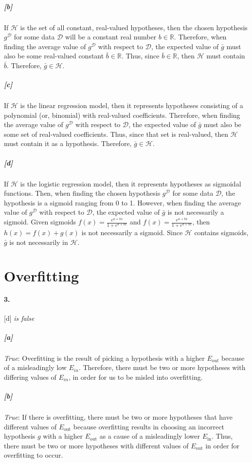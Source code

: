 \documentclass[titlepage]{article}
\begin{document}
	\subparagraph{[b]} If $\mathcal H$ is the set of all constant, real-valued hypotheses, then the chosen hypothesis $g^{\mathcal D}$ for some data $\mathcal D$ will be a constant real number $b \in \mathbb R$. Therefore, when finding the average value of $g^{\mathcal D}$ with respect to $\mathcal D$, the expected value of $\bar g$ must also be some real-valued constant $\bar {b} \in \mathbb{R}$. Thus, since $\bar b \in \mathbb R$, then $\mathcal H$ must contain $\bar b$. Therefore, $\bar g \in \mathcal H$.

	\subparagraph{[c]} If $\mathcal H$ is the linear regression model, then it represents hypotheses consisting of a polynomial (or, binomial) with real-valued coefficients. Therefore, when finding the average value of $g^{\mathcal D}$ with respect to $\mathcal D$, the expected value of $\bar g$ must also be some set of real-valued coefficients. Thus, since that set is real-valued, then $\mathcal H$ must contain it as a hypothesis. Therefore, $\bar g \in \mathcal H$.

	\subparagraph{[d]} If $\mathcal H$ is the logistic regression model, then it represents hypotheses as sigmoidal functions. Then, when finding the chosen hypothesis $g^{\mathcal D}$ for some data $\mathcal D$, the hypothesis is a sigmoid ranging from 0 to 1. However, when finding the average value of $g^{\mathcal D}$ with respect to $\mathcal D$, the expected value of $\bar g$ is not necessarily a sigmoid. Given sigmoids $f(x) = \frac{e^{a+bx}}{1+e^{a+bx}}$ and $f(x) = \frac{e^{a+bx}}{1+e^{a+bx}}$, then $h(x) = f(x) + g(x)$ is not necessarily a sigmoid. Since $\mathcal H$ contains sigmoids, $\bar g $ is not necessarily in $\mathcal H$.

\section*{Overfitting}
\paragraph{3.} [d] \textit{is false} 

	\subparagraph{[a]} \textit{True}: Overfitting is the result of picking a hypothesis with a higher $E_{out}$ because of a misleadingly low $E_{in}$. Therefore, there must be two or more hypotheses with differing values of $E_{in}$, in order for us to be misled into overfitting.

	\subparagraph{[b]} \textit{True}: If there is overfitting, there must be two or more hypotheses that have different values of $E_{\text{out}}$ because overfitting results in choosing an incorrect hypothesis $g$ with a higher $E_{\text{out}}$ as a cause of a misleadingly lower $E_{\text{in}}$. Thus, there must be two or more hypotheses with different values of $E_{\text{out}}$ in order for overfitting to occur. 
\end{document}
